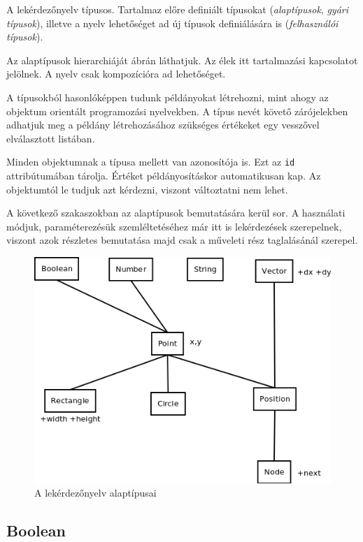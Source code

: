 A lekérdezőnyelv típusos. Tartalmaz előre definiált típusokat (\textit{alaptípusok}, \textit{gyári típusok}), illetve a nyelv lehetőséget ad új típusok definiálására is (\textit{felhasználói típusok}).

Az alaptípusok hierarchiáját  ábrán láthatjuk. Az élek itt tartalmazási kapcsolatot jelölnek. A nyelv csak kompozícióra ad lehetőséget.

A típusokból hasonlóképpen tudunk példányokat létrehozni, mint ahogy az objektum orientált programozási nyelvekben. A típus nevét követő zárójelekben adhatjuk meg a példány létrehozásához szükséges értékeket egy vesszővel elválasztott listában.

Minden objektumnak a típusa mellett van azonosítója is. Ezt az \texttt{id} attribútumában tárolja. Értéket példányosításkor automatikusan kap. Az objektumtól le tudjuk azt kérdezni, viszont változtatni nem lehet.

A következő szakaszokban az alaptípusok bemutatására kerül sor. A használati módjuk, paraméterezésük szemléltetéséhez már itt is lekérdezések szerepelnek, viszont azok részletes bemutatása majd csak a műveleti rész taglalásánál szerepel.

\begin{figure}[htb]
\begin{center}
    \includegraphics[scale=0.5]{images/types}
    \caption{A lekérdezőnyelv alaptípusai}
    \label{fig:types}
\end{center}
\end{figure}

\subsection{Boolean}

